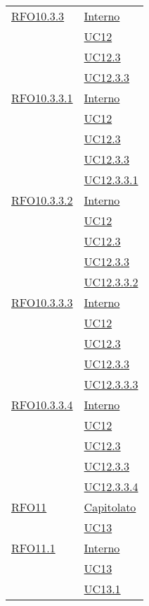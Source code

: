 \begin{longtable}{|>{\centering}m{5cm}|m{5cm}<{\centering}|}
 \hyperlink{RFO10.3.3}{RFO10.3.3} 
& \hyperlink{Interno}{Interno}\\
& \hyperref[UC12]{UC12}\\
& \hyperref[UC12.3]{UC12.3}\\
& \hyperref[UC12.3.3]{UC12.3.3}\\\hline

 \hyperlink{RFO10.3.3.1}{RFO10.3.3.1} 
& \hyperlink{Interno}{Interno}\\
& \hyperref[UC12]{UC12}\\
& \hyperref[UC12.3]{UC12.3}\\
& \hyperref[UC12.3.3]{UC12.3.3}\\
& \hyperref[UC12.3.3.1]{UC12.3.3.1}\\\hline

 \hyperlink{RFO10.3.3.2}{RFO10.3.3.2} 
& \hyperlink{Interno}{Interno}\\
& \hyperref[UC12]{UC12}\\
& \hyperref[UC12.3]{UC12.3}\\
& \hyperref[UC12.3.3]{UC12.3.3}\\
& \hyperref[UC12.3.3.2]{UC12.3.3.2}\\\hline

 \hyperlink{RFO10.3.3.3}{RFO10.3.3.3} 
& \hyperlink{Interno}{Interno}\\
& \hyperref[UC12]{UC12}\\
& \hyperref[UC12.3]{UC12.3}\\
& \hyperref[UC12.3.3]{UC12.3.3}\\
& \hyperref[UC12.3.3.3]{UC12.3.3.3}\\\hline

 \hyperlink{RFO10.3.3.4}{RFO10.3.3.4} 
& \hyperlink{Interno}{Interno}\\
& \hyperref[UC12]{UC12}\\
& \hyperref[UC12.3]{UC12.3}\\
& \hyperref[UC12.3.3]{UC12.3.3}\\
& \hyperref[UC12.3.3.4]{UC12.3.3.4}\\\hline

 \hyperlink{RFO11}{RFO11} 
  & \hyperlink{Capitolato}{Capitolato}\\
& \hyperref[UC13]{UC13}\\\hline

\hyperlink{RFO11.1}{RFO11.1} 
& \hyperlink{Interno}{Interno}\\
& \hyperref[UC13]{UC13}\\
& \hyperref[UC13.1]{UC13.1}\\\hline


\end{longtable}
